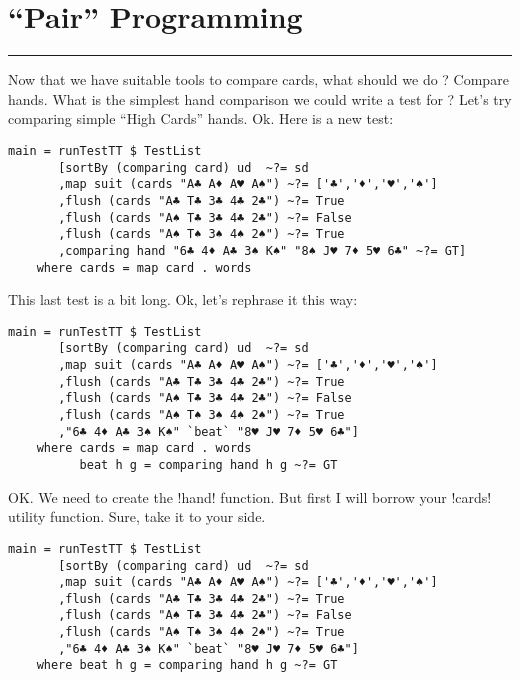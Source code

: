 \newpage
\section{``Pair'' Programming} 
\vspace{10cm}
\hrule

\lhQ Now that we have suitable tools to compare cards, what should we do ?
\lhA Compare hands.
\lhN What is the simplest hand comparison we could write a test for ?
\lhA Let's try comparing simple ``High Cards'' hands.
\lhN Ok. Here is a new test:
\begin{lstlisting}[frame=single,escapechar=!]
main = runTestTT $ TestList 
       [sortBy (comparing card) ud  ~?= sd
       ,map suit (cards "A♣ A♦ A♥ A♠") ~?= ['♣','♦','♥','♠']
       ,flush (cards "A♣ T♣ 3♣ 4♣ 2♣") ~?= True
       ,flush (cards "A♠ T♣ 3♣ 4♣ 2♣") ~?= False
       ,flush (cards "A♠ T♠ 3♠ 4♠ 2♠") ~?= True
       ,comparing hand "6♣ 4♦ A♣ 3♠ K♠" "8♠ J♥ 7♦ 5♥ 6♣" ~?= GT]
    where cards = map card . words 
\end{lstlisting} %
\hspace*{\fill}
\lhA This last test is a bit long.
\lhN Ok, let's rephrase it this way:
\begin{lstlisting}[frame=single]
main = runTestTT $ TestList 
       [sortBy (comparing card) ud  ~?= sd
       ,map suit (cards "A♣ A♦ A♥ A♠") ~?= ['♣','♦','♥','♠']
       ,flush (cards "A♣ T♣ 3♣ 4♣ 2♣") ~?= True
       ,flush (cards "A♠ T♣ 3♣ 4♣ 2♣") ~?= False
       ,flush (cards "A♠ T♠ 3♠ 4♠ 2♠") ~?= True
       ,"6♣ 4♦ A♣ 3♠ K♠" `beat` "8♥ J♥ 7♦ 5♥ 6♣"]
    where cards = map card . words 
          beat h g = comparing hand h g ~?= GT
\end{lstlisting} %
\hspace*{\fill}
\lhA \error OK. We need to create the \il!hand! function. But first I will borrow your \il!cards! utility function.
\lhN Sure, take it to your side.
\begin{lstlisting}[frame=single]
main = runTestTT $ TestList 
       [sortBy (comparing card) ud  ~?= sd
       ,map suit (cards "A♣ A♦ A♥ A♠") ~?= ['♣','♦','♥','♠']
       ,flush (cards "A♣ T♣ 3♣ 4♣ 2♣") ~?= True
       ,flush (cards "A♠ T♣ 3♣ 4♣ 2♣") ~?= False
       ,flush (cards "A♠ T♠ 3♠ 4♠ 2♠") ~?= True
       ,"6♣ 4♦ A♣ 3♠ K♠" `beat` "8♥ J♥ 7♦ 5♥ 6♣"]
    where beat h g = comparing hand h g ~?= GT
\end{lstlisting} %
